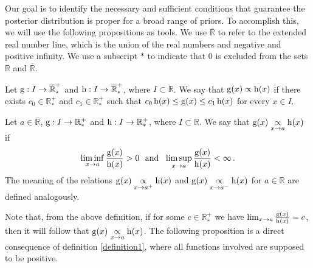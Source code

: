 
Our goal is to identify the necessary and sufficient conditions that guarantee the posterior distribution is proper for a broad range of priors. To accomplish this, we will use the following propositions as tools. We use $\overline{\mathbb{R}}$ to refer to the extended real number line, which is the union of the real numbers and negative and positive infinity. We use a subscript $*$ to indicate that $0$ is excluded from the sets $\mathbb{R}$ and $\overline{\mathbb{R}}$.

\begin{definition}\label{definition0} Let $\operatorname{g}:I\to\overline{\mathbb{R}}_*^+$ and $\operatorname{h}:I\to\overline{\mathbb{R}}_*^+$, where $I\subset\mathbb{R}$. We say that $\operatorname{g}(x)\propto \operatorname{h}(x)$ if there exists $c_0\in \mathbb{R}^+_*$ and $c_1\in \mathbb{R}^+_*$ such that $c_0\operatorname{h}(x) \leq \operatorname{g}(x) \leq c_1\operatorname{h}(x)$ for every $x\in I$.
\end{definition}

\begin{definition}\label{definition1}
Let $a\in \mathbb{\overline{R}}$, $\operatorname{g}:I\to\mathbb{R^+_*}$ and $\operatorname{h}:I\to\mathbb{R^+_*}$, where $I\subset\mathbb{R}$. We say that $\operatorname{g}(x)\underset{x\to a}{\propto} \operatorname{h}(x)$ if
\begin{equation*}
\liminf_{x\to a} \frac{\operatorname{g}(x)}{\operatorname{h}(x)} > 0\ \mbox{ and }\ \limsup_{x\to a} \frac{\operatorname{g}(x)}{\operatorname{h}(x)} < \infty  \,.
\end{equation*}
The meaning of the relations $\operatorname{g}(x)\underset{x\to a^+}{\propto} \operatorname{h}(x)$ and $\operatorname{g}(x)\underset{x\to a^-}{\propto} \operatorname{h}(x)$ for $a\in \mathbb{R}$ are defined analogously.
\end{definition}

Note that, from the above definition, if for some $c\in \mathbb{R}^+_*$ we have $\lim_{x\to a} \frac{\operatorname{g}(x)}{\operatorname{h}(x)} = c$, then it will follow that $\operatorname{g}(x)\underset{x\to a}{\propto} \operatorname{h}(x)$. The following proposition is a direct consequence of definition \ref{definition1}, where all functions involved are supposed to be positive.

